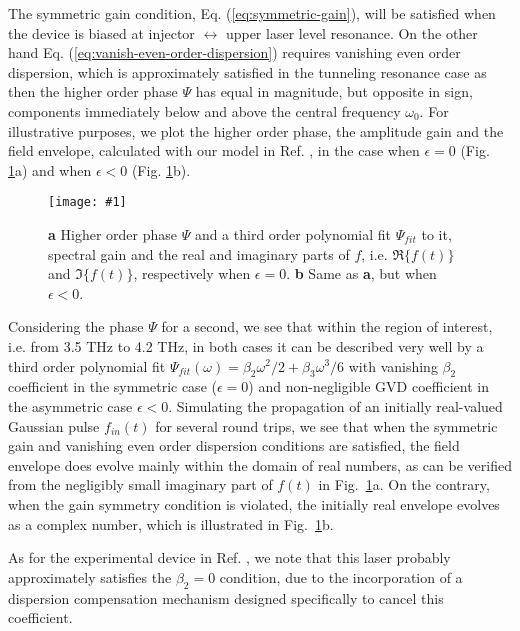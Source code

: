 \documentclass[preprint,secnumarabic,amssymb, nobibnotes, aip, prd]{revtex4-1}
\newcommand{\vspacec}{\vspace{-0.3cm}}
\newcommand{\includegraphicsXL}[1]{\texttt{[image: \#1]}}
\begin{document}
The symmetric gain condition, Eq. (\ref{eq:symmetric-gain}), will be satisfied when the device is biased at injector $\leftrightarrow$ upper laser level resonance. On the other hand Eq. (\ref{eq:vanish-even-order-dispersion}) requires vanishing even order dispersion, which is approximately satisfied in the tunneling resonance case as then the higher order phase $\Psi$ has equal in magnitude, but opposite in sign, components immediately below and above the central frequency $\omega_0$. For illustrative purposes, we plot the higher order phase, the amplitude gain and the field envelope, calculated with our model in Ref. , in the case when $\epsilon = 0$ (Fig. \ref{fig:dispersion-on-off-resonance}a) and when $\epsilon < 0$ (Fig. \ref{fig:dispersion-on-off-resonance}b). 
\begin{figure}[h!]
	\begin{center}
		\includegraphicsXL{IMGS/dispersion-on-off-resonance.eps}
		\caption{ \textbf{a} Higher order phase $\Psi$ and a third order polynomial fit $\Psi_{fit}$ to it, spectral gain  and the real and imaginary parts of $f$, i.e. $\Re\{f(t)\}$ and $\Im\{f(t)\}$, respectively when $\epsilon = 0$. \textbf{b} Same as \textbf{a}, but when $\epsilon <0$.  } \label{fig:dispersion-on-off-resonance}
	\end{center}	
\end{figure}

\vspacec
Considering the phase $\Psi$ for a second, we see that within the region of interest, i.e. from 3.5 THz to 4.2 THz, in both cases it can be described very well by a third order polynomial fit $\Psi_{fit}(\omega) = \beta_2\omega^2/2 + \beta_3\omega^3/6$ with vanishing $\beta_2$ coefficient in the symmetric case ($\epsilon = 0$) and non-negligible GVD coefficient in the asymmetric case $\epsilon <0$. Simulating the propagation of an initially real-valued Gaussian pulse $f_{in}(t)$ for several round trips, we see that when the symmetric gain and vanishing even order dispersion conditions are satisfied, the field envelope does evolve mainly within the domain of real numbers, as can be verified from the negligibly small imaginary part of $f(t)$ in Fig.~\ref{fig:dispersion-on-off-resonance}a. On the contrary, when the gain symmetry condition is violated, the initially real envelope evolves as a complex number, which is illustrated in Fig.~\ref{fig:dispersion-on-off-resonance}b.

As for the experimental device in Ref. , we note that this laser probably approximately satisfies the $\beta_2 = 0$ condition, due to the incorporation of a dispersion compensation mechanism designed specifically to cancel this coefficient. 
\end{document}
